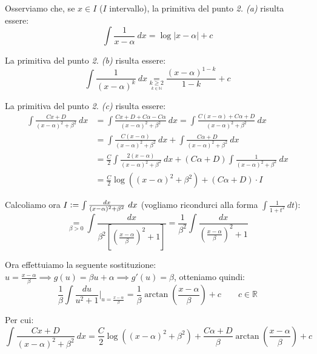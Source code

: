 \documentclass{article}
\begin{document}
\noindent Osserviamo che, se $x \in I$ ($I$ intervallo), la primitiva del punto \textit{2. (a)} risulta essere:
\begin{equation*}
    \int \frac{1}{x - \alpha} \ dx = \log|x - \alpha| + c
\end{equation*}

\noindent La primitiva del punto \textit{2. (b)} risulta essere:
\begin{equation*}
    \int \frac{1}{(x - \alpha)^k} \ dx \underset{\underset{\scriptstyle k \in \mathbb{N}}{k \geq 2}}{=} \frac{(x - \alpha)^{1 - k}}{1 - k} + c
\end{equation*}

\noindent La primitiva del punto \textit{2. (c)} risulta essere:
\begin{align*}
    \int \frac{Cx + D}{(x - \alpha)^2 + \beta^2} \ dx &= \int \frac{Cx + D + C\alpha - C\alpha}{(x - \alpha)^2 + \beta^2} \ dx = \int \frac{C(x - \alpha) + C\alpha + D}{(x - \alpha)^2 + \beta^2} \ dx \\
    &= \int \frac{C(x - \alpha)}{(x - \alpha)^2 + \beta^2} \ dx + \int \frac{C\alpha + D}{(x - \alpha)^2 + \beta^2} \ dx \\ 
    &= \frac{C}{2} \int \frac{2(x - \alpha)}{(x - \alpha)^2 + \beta^2} \ dx + (C\alpha + D) \int \frac{1}{(x - \alpha)^2 + \beta^2} \ dx \\ 
    &= \frac{C}{2} \log((x - \alpha)^2 + \beta^2) + (C\alpha + D) \cdot I
\end{align*}

\noindent Calcoliamo ora $I \vcentcolon = \int \frac{dx}{(x - \alpha)^2 + \beta^2} \ dx$ (vogliamo ricondurci alla forma $\int \frac{1}{1 + t^2} \ dt$):
\begin{equation*}
    \underset{\beta > 0}{=} \int \frac{dx}{\beta^2 [(\frac{x - \alpha}{\beta})^2 + 1]} = \frac{1}{\beta^2} \int \frac{dx}{(\frac{x - \alpha}{\beta})^2 + 1}
\end{equation*}

\noindent Ora effettuiamo la seguente sostituzione: $u = \frac{x - \alpha}{\beta} \implies g(u) = \beta u + \alpha \implies g'(u) = \beta$, otteniamo quindi:
\begin{equation*}
    \frac{1}{\beta} \int \frac{du}{u^2 + 1} \bigg|_{u = \frac{x - \alpha}{\beta}} = \frac{1}{\beta} \arctan\left(\frac{x - \alpha}{\beta}\right) + c \qquad c \in \mathbb{R}
\end{equation*}

\noindent Per cui:
\begin{equation*}
    \int \frac{Cx + D}{(x - \alpha)^2 + \beta^2} \ dx = \frac{C}{2} \log((x - \alpha)^2 + \beta^2) + \frac{C\alpha + D}{\beta} \arctan\left(\frac{x - \alpha}{\beta}\right) + c
\end{equation*}
\end{document}

